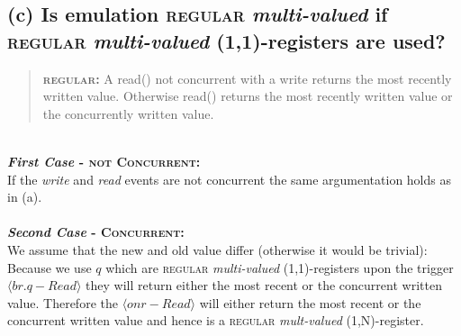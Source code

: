 \documentclass{article}
\begin{document}
\begin{adjustwidth}{2em}{2em}
		\subsection*{(c) Is emulation \textsc{regular} \textit{multi-valued} if \textsc{regular} \textit{multi-valued} (1,1)-registers are used?}
		\begin{adjustwidth}{1em}{2em}
			\begin{quote}
				\textbf{\textsc{regular}:} A read() not concurrent with a write returns the most recently written value. Otherwise read() returns the most recently written value or the concurrently written value.
			\end{quote}
			\hfill \\
			\textbf{\textit{First Case} - \textsc{not Concurrent}:} \\
			If the \textit{write} and \textit{read} events are not concurrent the same argumentation holds as in (a). \\
			\newpage
			\hfill \\
			\textbf{\textit{Second Case} - \textsc{Concurrent}:} \\
			We assume that the new and old value differ (otherwise it would be trivial): \\
			Because we use $q$ which are \textsc{regular} \textit{multi-valued} (1,1)-registers upon the trigger $\langle br.q-Read \rangle$ they will return either the most recent or the concurrent written value. Therefore the $\langle onr-Read \rangle$ will either return the most recent or the concurrent written value and hence is a \textsc{regular}	\textit{mult-valued} (1,N)-register.
		\end{adjustwidth}
	\end{adjustwidth}
	
\end{document}
